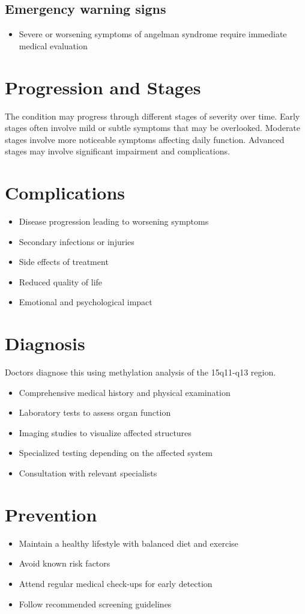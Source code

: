 \subsection{Emergency warning signs}
\begin{itemize}[noitemsep]
  \item Severe or worsening symptoms of angelman syndrome require immediate medical evaluation
\end{itemize}
\section{Progression and Stages}
The condition may progress through different stages of severity over time. Early stages often involve mild or subtle symptoms that may be overlooked. Moderate stages involve more noticeable symptoms affecting daily function. Advanced stages may involve significant impairment and complications.
\section{Complications}
\begin{itemize}[noitemsep]
  \item Disease progression leading to worsening symptoms
  \item Secondary infections or injuries
  \item Side effects of treatment
  \item Reduced quality of life
  \item Emotional and psychological impact
\end{itemize}
\section{Diagnosis}
Doctors diagnose this using methylation analysis of the 15q11-q13 region.

\begin{itemize}[noitemsep]
  \item Comprehensive medical history and physical examination
  \item Laboratory tests to assess organ function
  \item Imaging studies to visualize affected structures
  \item Specialized testing depending on the affected system
  \item Consultation with relevant specialists
\end{itemize}
\section{Prevention}
\begin{itemize}[noitemsep]
  \item Maintain a healthy lifestyle with balanced diet and exercise
  \item Avoid known risk factors
  \item Attend regular medical check-ups for early detection
  \item Follow recommended screening guidelines
\end{itemize}
